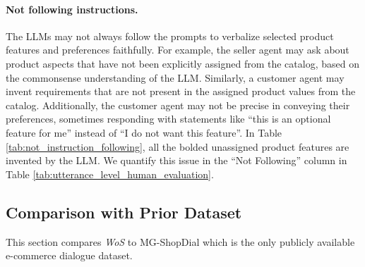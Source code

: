  \paragraph{Not following instructions.} The LLMs may not always follow the prompts to verbalize selected product features and preferences faithfully. For example, the seller agent may ask about product aspects that have not been explicitly assigned from the catalog, based on the commonsense understanding of the LLM. Similarly, a customer agent may invent requirements that are not present in the assigned product values from the catalog. Additionally, the customer agent may not be precise in conveying their preferences, sometimes responding with statements like ``this is an optional feature for me'' instead of ``I do not want this feature''. In Table \ref{tab:not_instruction_following}, all the bolded unassigned product features are invented by the LLM. %
 We quantify this issue in the ``Not Following'' column in Table \ref{tab:utterance_level_human_evaluation}.

\subsection{Comparison with Prior Dataset}\label{sec:mgshopdial_comparison}

This section compares \textit{WoS} to MG-ShopDial \cite{Bernard:2023:SIGIR} which is the only publicly available e-commerce dialogue dataset. %
\vspace{-0.5em}

